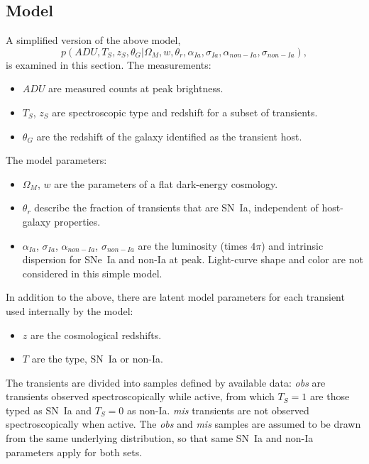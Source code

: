 \documentclass[preprint]{aastex}
\begin{document}
\subsection{Model}
\label{example:sec}
A simplified version of the above model,
\begin{equation}
p(\mathit{ADU}, {{T}}_S,{{z}}_S, \theta_G|  \Omega_M, w, \theta_r,\alpha_{Ia},\sigma_{Ia}, \alpha_{\mathit{non-Ia}},\sigma_{\mathit{non-Ia}}),
\end{equation}
is examined in this section.
The measurements: 
\begin{itemize}
\item $\mathit{ADU}$ are measured counts at peak brightness.
\item ${{T}}_S$, ${{z}}_S$ are spectroscopic type and redshift for a subset of transients.
\item $\theta_G$ are the redshift of the galaxy identified as the transient host.
\end{itemize}
The model parameters:
\begin{itemize}
\item $\Omega_M$, $w$ are the parameters of a flat dark-energy cosmology.
\item $\theta_r$ describe the fraction of transients that are SN~Ia, independent
of host-galaxy properties.
\item $\alpha_{Ia}$, $\sigma_{Ia}$, $\alpha_{\mathit{non-Ia}}$, $\sigma_{\mathit{non-Ia}}$ are
the luminosity (times $4\pi$) and intrinsic dispersion for SNe~Ia and non-Ia at peak.
Light-curve shape and color are not considered in this simple model.
\end{itemize}

In addition to the above, there are latent model parameters for each transient used internally
by the model:
\begin{itemize}
\item $z$ are the cosmological redshifts.
\item $T$ are the type, SN~Ia or non-Ia.
\end{itemize}

The transients are divided into samples defined by available data: {\it obs} are transients observed spectroscopically while active, from which $T_S=1$ are those typed
as SN~Ia and $T_S=0$ as non-Ia.  {\it mis} transients are not observed
spectroscopically when active.  The  {\it obs} and {\it mis} samples
are assumed to be drawn from the same underlying distribution, so that 
same SN~Ia and non-Ia parameters apply for both sets.
\end{document}
